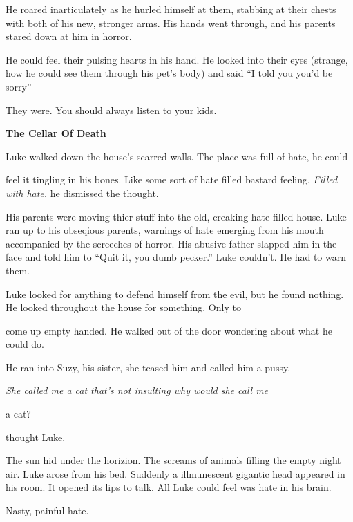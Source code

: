 He roared inarticulately as he hurled himself at them, stabbing at
their chests with both of his new, stronger arms. His hands went
through, and his parents stared down at him in horror.



He could feel their pulsing hearts in his hand. He looked into
their eyes (strange, how he could see them through his pet's body)
and said ``I told you you'd be sorry''



They were. You should always listen to your kids. 

 





{\bf The Cellar Of Death}



Luke walked down the house's scarred walls. The place was full of
hate, he could

feel it tingling in his bones. Like some sort of hate filled
bastard feeling. {\em Filled with hate.} he dismissed the
thought.



His parents were moving thier stuff into the old, creaking hate
filled house. Luke ran up to his obseqious parents, warnings of
hate emerging from his mouth accompanied by the screeches of
horror. His abusive father slapped him in the face and told him to
``Quit it, you dumb pecker.'' Luke couldn't. He had to warn
them.



Luke looked for anything to defend himself from the evil, but he
found nothing. He looked throughout the house for something. Only
to

come up empty handed. He walked out of the door wondering about
what he could do.



He ran into Suzy, his sister, she teased him and called him a
pussy. {\em She called me a cat that's not insulting why would she
call me

a cat?} thought Luke.



The sun hid under the horizion. The screams of animals filling the
empty night air. Luke arose from his bed. Suddenly a illmunescent
gigantic head appeared in his room. It opened its lips to talk. All
Luke could feel was hate in his brain.

Nasty, painful hate.



